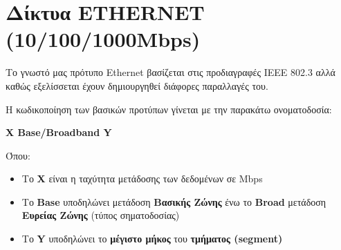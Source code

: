 %
%
\setcounter{section}{3}
\section{Δίκτυα ETHERNET (10/100/1000Mbps)}

Το γνωστό μας πρότυπο Ethernet βασίζεται στις προδιαγραφές IEEE 802.3 αλλά καθώς εξελίσσεται έχουν δημιουργηθεί διάφορες παραλλαγές του. 

Η κωδικοποίηση των βασικών προτύπων γίνεται με την παρακάτω ονοματοδοσία:

\begin{center}
\textbf{Χ Base/Broadband Y}
\end{center}

Όπου:

\begin{itemize}
\item Το \textbf{X} είναι η ταχύτητα μετάδοσης των δεδομένων σε Mbps
\item Το \textbf{Base} υποδηλώνει μετάδοση \textbf{Βασικής Ζώνης} ένω το \textbf{Broad} μετάδοση \textbf{Ευρείας Ζώνης} (τύπος σηματοδοσίας)
\item Το \textbf{Y} υποδηλώνει το \textbf{μέγιστο μήκος} του \textbf{τμήματος (segment)}
\end{itemize}

